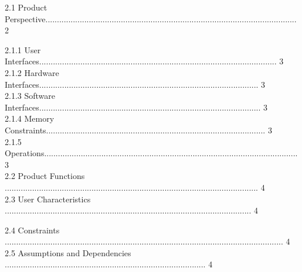 \documentclass[10pt,draftclsnofoot,onecolumn]{IEEEtran}
\newcommand\tab[1][1cm]{\hspace*{#1}}
\begin{document}
\tab  2.1 Product Perspective.............................................................................................................. 2\\
                 \vspace{5mm}



\tab\tab 2.1.1 User Interfaces........................................................................................................ 3\\
                 \vspace{5mm}
\tab\tab 2.1.2 Hardware Interfaces................................................................................................ 3\\
                 \vspace{5mm}
\tab\tab 2.1.3 Software Interfaces................................................................................................. 3\\
                 \vspace{5mm}
\tab\tab 2.1.4 Memory Constraints................................................................................................ 3\\
                 \vspace{5mm}
\tab\tab 2.1.5 Operations............................................................................................................... 3\\
                 \vspace{5mm}
\tab 2.2 Product Functions ............................................................................................................... 4\\
                 \vspace{5mm}
\tab 2.3 User Characteristics ............................................................................................................ 4\\
                 \vspace{5mm}

\tab 2.4 Constraints .......................................................................................................................... 4\\
                 \vspace{5mm}
\tab 2.5 Assumptions and Dependencies ........................................................................................ 4\\
                 \vspace{5mm}
\end{document}
